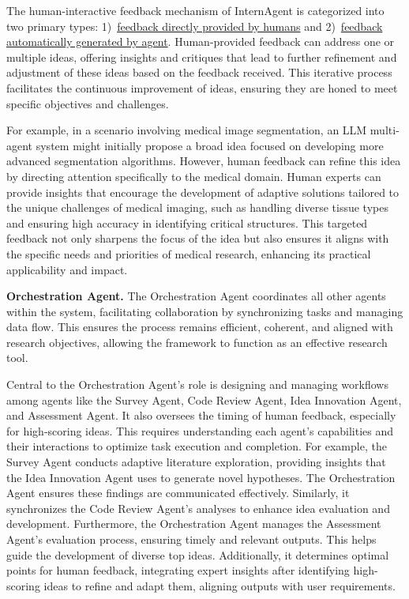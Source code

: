 The human-interactive feedback mechanism of InternAgent is categorized into two primary types: 1)~\underline{feedback directly provided by humans} and 2)~\underline{feedback automatically generated by agent}. Human-provided feedback can address one or multiple ideas, offering insights and critiques that lead to further refinement and adjustment of these ideas based on the feedback received. This iterative process facilitates the continuous improvement of ideas, ensuring they are honed to meet specific objectives and challenges.

For example, in a scenario involving medical image segmentation, an LLM multi-agent system might initially propose a broad idea focused on developing more advanced segmentation algorithms. However, human feedback can refine this idea by directing attention specifically to the medical domain. Human experts can provide insights that encourage the development of adaptive solutions tailored to the unique challenges of medical imaging, such as handling diverse tissue types and ensuring high accuracy in identifying critical structures. This targeted feedback not only sharpens the focus of the idea but also ensures it aligns with the specific needs and priorities of medical research, enhancing its practical applicability and impact.

\noindent \textbf{Orchestration Agent.}
\label{sec:orchestration_agent}
The Orchestration Agent coordinates all other agents within the system, facilitating collaboration by synchronizing tasks and managing data flow. This ensures the process remains efficient, coherent, and aligned with research objectives, allowing the framework to function as an effective research tool. 

Central to the Orchestration Agent's role is designing and managing workflows among agents like the Survey Agent, Code Review Agent, Idea Innovation Agent, and Assessment Agent. It also oversees the timing of human feedback, especially for high-scoring ideas. This requires understanding each agent's capabilities and their interactions to optimize task execution and completion. For example, the Survey Agent conducts adaptive literature exploration, providing insights that the Idea Innovation Agent uses to generate novel hypotheses. The Orchestration Agent ensures these findings are communicated effectively. Similarly, it synchronizes the Code Review Agent's analyses to enhance idea evaluation and development. Furthermore, the Orchestration Agent manages the Assessment Agent’s evaluation process, ensuring timely and relevant outputs. This helps guide the development of diverse top ideas. Additionally, it determines optimal points for human feedback, integrating expert insights after identifying high-scoring ideas to refine and adapt them, aligning outputs with user requirements.


